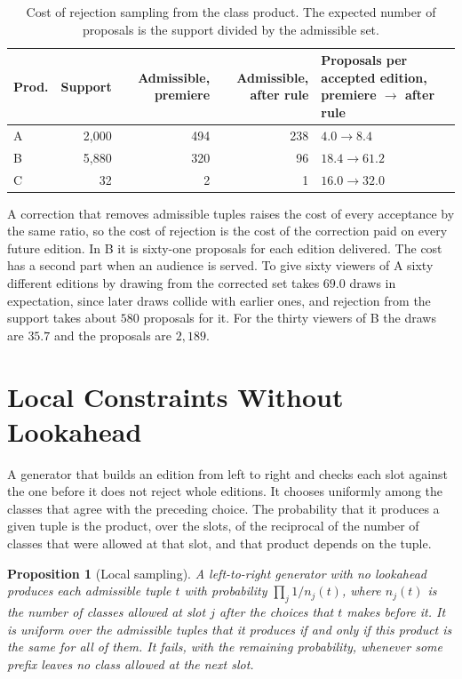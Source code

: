 \documentclass[11pt,twoside,openright]{book}
\theoremstyle{plain}
\newtheorem{proposition}[theorem]{Proposition}
\theoremstyle{definition}
\theoremstyle{remark}
\begin{document}
\begin{table}[ht]
\centering
\begin{tabular}{@{}lrrrp{3.6cm}@{}}
\toprule
Prod. & Support & Admissible, premiere & Admissible, after rule & Proposals per accepted edition, premiere $\to$ after rule\\
\midrule
A & 2{,}000 & 494 & 238 & $4.0\to8.4$\\
B & 5{,}880 & 320 & 96 & $18.4\to61.2$\\
C & 32 & 2 & 1 & $16.0\to32.0$\\
\bottomrule
\end{tabular}
\caption{Cost of rejection sampling from the class product. The expected number of proposals is the support divided by the admissible set.}\label{tab:rej16}
\end{table}

A correction that removes admissible tuples raises the cost of every acceptance by the same ratio, so the cost of rejection is the cost of the correction paid on every future edition. In B it is sixty-one proposals for each edition delivered. The cost has a second part when an audience is served. To give sixty viewers of A sixty different editions by drawing from the corrected set takes $69.0$ draws in expectation, since later draws collide with earlier ones, and rejection from the support takes about $580$ proposals for it. For the thirty viewers of B the draws are $35.7$ and the proposals are $2{,}189$.

\section{Local Constraints Without Lookahead}\label{sec:local16}

A generator that builds an edition from left to right and checks each slot against the one before it does not reject whole editions. It chooses uniformly among the classes that agree with the preceding choice. The probability that it produces a given tuple is the product, over the slots, of the reciprocal of the number of classes that were allowed at that slot, and that product depends on the tuple.

\begin{proposition}[Local sampling]\label{prop:local16}
A left-to-right generator with no lookahead produces each admissible tuple $t$ with probability $\prod_j1/n_j(t)$, where $n_j(t)$ is the number of classes allowed at slot $j$ after the choices that $t$ makes before it. It is uniform over the admissible tuples that it produces if and only if this product is the same for all of them. It fails, with the remaining probability, whenever some prefix leaves no class allowed at the next slot.
\end{proposition}
\end{document}
